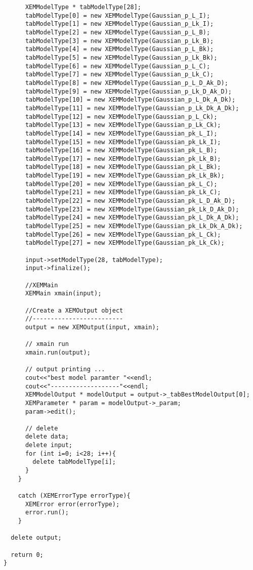 {\begin{verbatim}
      XEMModelType * tabModelType[28];
      tabModelType[0] = new XEMModelType(Gaussian_p_L_I);
      tabModelType[1] = new XEMModelType(Gaussian_p_Lk_I);
      tabModelType[2] = new XEMModelType(Gaussian_p_L_B);
      tabModelType[3] = new XEMModelType(Gaussian_p_Lk_B);
      tabModelType[4] = new XEMModelType(Gaussian_p_L_Bk);
      tabModelType[5] = new XEMModelType(Gaussian_p_Lk_Bk);
      tabModelType[6] = new XEMModelType(Gaussian_p_L_C);
      tabModelType[7] = new XEMModelType(Gaussian_p_Lk_C);
      tabModelType[8] = new XEMModelType(Gaussian_p_L_D_Ak_D);
      tabModelType[9] = new XEMModelType(Gaussian_p_Lk_D_Ak_D);
      tabModelType[10] = new XEMModelType(Gaussian_p_L_Dk_A_Dk);
      tabModelType[11] = new XEMModelType(Gaussian_p_Lk_Dk_A_Dk);
      tabModelType[12] = new XEMModelType(Gaussian_p_L_Ck);
      tabModelType[13] = new XEMModelType(Gaussian_p_Lk_Ck);
      tabModelType[14] = new XEMModelType(Gaussian_pk_L_I);
      tabModelType[15] = new XEMModelType(Gaussian_pk_Lk_I);
      tabModelType[16] = new XEMModelType(Gaussian_pk_L_B);
      tabModelType[17] = new XEMModelType(Gaussian_pk_Lk_B);
      tabModelType[18] = new XEMModelType(Gaussian_pk_L_Bk);
      tabModelType[19] = new XEMModelType(Gaussian_pk_Lk_Bk);
      tabModelType[20] = new XEMModelType(Gaussian_pk_L_C);
      tabModelType[21] = new XEMModelType(Gaussian_pk_Lk_C);
      tabModelType[22] = new XEMModelType(Gaussian_pk_L_D_Ak_D);
      tabModelType[23] = new XEMModelType(Gaussian_pk_Lk_D_Ak_D);
      tabModelType[24] = new XEMModelType(Gaussian_pk_L_Dk_A_Dk);
      tabModelType[25] = new XEMModelType(Gaussian_pk_Lk_Dk_A_Dk);
      tabModelType[26] = new XEMModelType(Gaussian_pk_L_Ck);
      tabModelType[27] = new XEMModelType(Gaussian_pk_Lk_Ck);

      input->setModelType(28, tabModelType);
      input->finalize();

      //XEMMain
      XEMMain xmain(input);

      //Create a XEMOutput object
      //-------------------------
      output = new XEMOutput(input, xmain);

      // xmain run
      xmain.run(output);

      // output printing ...
      cout<<"best model paramter "<<endl;
      cout<<"-------------------"<<endl;
      XEMModelOutput * modelOutput = output->_tabBestModelOutput[0];
      XEMParameter * param = modelOutput->_param;
      param->edit();

      // delete
      delete data;
      delete input;
      for (int i=0; i<28; i++){
        delete tabModelType[i];
      }
    }

    catch (XEMErrorType errorType){
      XEMError error(errorType);
      error.run();
    }

  delete output;

  return 0;
}
\end{verbatim}}



